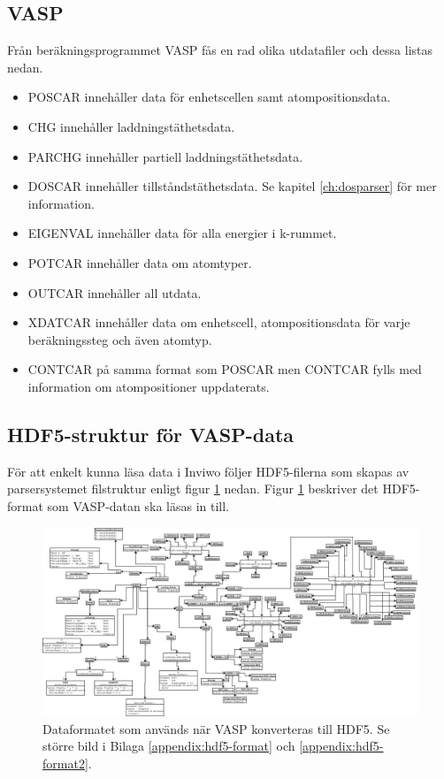 \documentclass[a4paper,12pt]{article}
\begin{document}
\subsection{VASP}
Från beräkningsprogrammet VASP fås en rad olika utdatafiler och dessa listas nedan.  

\begin{itemize}
	\item{POSCAR} innehåller data för enhetscellen samt atompositionsdata.
    \item{CHG} innehåller laddningstäthetsdata.
    \item{PARCHG} innehåller partiell laddningstäthetsdata.
    \item{DOSCAR} innehåller tillståndstäthetsdata. Se kapitel \ref{ch:dosparser} för mer information.
    \item{EIGENVAL} innehåller data för alla energier i k-rummet.
    \item{POTCAR} innehåller data om atomtyper.
    \item{OUTCAR} innehåller all utdata.
    \item{XDATCAR} innehåller data om enhetscell, atompositionsdata för varje beräkningssteg och även atomtyp.
    \item{CONTCAR} på samma format som POSCAR men CONTCAR fylls med information om atompositioner uppdaterats.
\end{itemize}

\subsection{HDF5-struktur för VASP-data}
\label{ch:hdf5struktur}
För att enkelt kunna läsa data i Inviwo följer HDF5-filerna som skapas av parsersystemet filstruktur enligt figur \ref{fig:hdf5-dataformat3} nedan. Figur \ref{fig:hdf5-dataformat3}
beskriver det HDF5-format som VASP-datan
ska läsas in till.

\begin{figure}[H]
    \centering
    \includegraphics[scale=0.16]{hdf5-dataformat3modi.png}
    \caption{Dataformatet som används när VASP konverteras till HDF5.
    Se större bild i Bilaga \ref{appendix:hdf5-format} och \ref{appendix:hdf5-format2}.}
    \label{fig:hdf5-dataformat3}
\end{figure}
\end{document}
